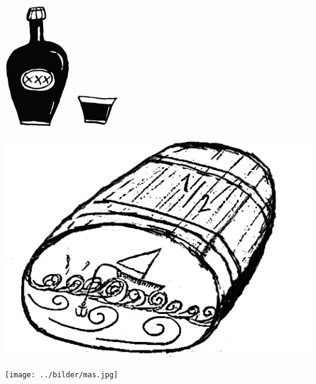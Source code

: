 %

\begin{intersong}
\sffamily\bfseries\LARGE{}
\begin{center}
\includegraphics[width=5cm]{../bilder/fardigabilder/BilderTillKapitel/brannvin.png} 
\end{center}
\end{intersong}
\sclearpage

\sclearpage

\sclearpage



\sclearpage


\sclearpage

\begin{intersong}
	\begin{center}
		\includegraphics[width=1\textwidth]{../bilder/fardigabilder/CamillasFardigaBilder/Halvankaren2.png} 
	\end{center}
\end{intersong}

%
\sclearpage

\begin{intersong}
\begin{center}
\texttt{[image: ../bilder/mas.jpg]} 
\end{center}
\end{intersong}
